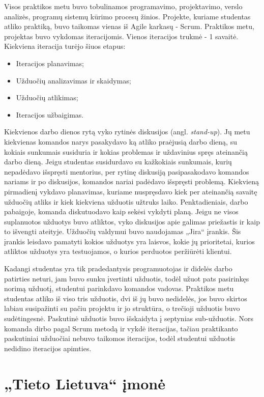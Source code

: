 \documentclass{VUMIFPSbakalaurinis}
\begin{document}
Visos praktikos metu buvo tobulinamos programavimo, projektavimo, verslo analizės, programų sistemų kūrimo procesų žinios. Projekte, kuriame studentas atliko praktiką, buvo taikomas vienas iš Agile karkasų - Scrum. Praktikos metu, projektas buvo vykdomas iteracijomis. Vienos iteracijos trukmė - 1 savaitė. Kiekviena iteracija turėjo šiuos etapus:
\begin{itemize}
    \item Iteracijos planavimas;
    \item Užduočių analizavimas ir skaidymas;
    \item Užduočių atlikimas;
    \item Iteracijos užbaigimas.
\end{itemize}
Kiekvienos darbo dienos rytą vyko rytinės diskusijos (angl. \textit{stand-up}). Jų metu kiekvienas komandos narys pasakydavo ką atliko praėjusią darbo dieną, su kokiais sunkumais susiduria ir kokias problemas ir uždavinius spręs ateinančią darbo dieną. Jeigu studentas susidurdavo su kažkokiais sunkumais, kurių nepadėdavo išspręsti mentorius, per rytinę diskusiją pasipasakodavo komandos nariams ir po diskusijos, komandos nariai padėdavo išspręsti problemą. Kiekvieną pirmadienį vykdavo planavimas, kuriame nuspręsdavo kiek per ateinančią savaitę užduočių atliks ir kiek kiekviena užduotis užtruks laiko. Penktadieniais, darbo pabaigoje, komanda diskutuodavo kaip sekėsi vykdyti planą. Jeigu ne visos suplanuotos užduotys buvo atliktos, vyko diskusijos apie galimas priežastis ir kaip to išvengti ateityje. Užduočių valdymui buvo naudojamas „Jira“ įrankis. Šis įrankis leisdavo pamatyti kokios užduotys yra laisvos, kokie jų prioritetai, kurios atliktos užduotys yra testuojamos, o kurios perduotos peržiūrėti klientui.


Kadangi studentas yra tik pradedantysis programuotojas ir didelės darbo patirties neturi, jam buvo sunku įvertinti užduotis, todėl užuot pats pasirinkęs norimą užduotį, studentui parinkdavo komandos vadovas. Praktikos metu studentas atliko iš viso tris užduotis, dvi iš jų buvo nedidelės, jos buvo skirtos labiau susipažinti su pačiu projektu ir jo struktūra, o trečioji užduotis buvo sudėtingesnė. Paskutinė užduotis buvo išskaidyta į septynias sub-užduotis. Nors komanda dirbo pagal Scrum metodą ir vykdė iteracijas, tačiau praktikanto paskutiniai užduočiai nebuvo taikomos iteracijos, todėl studentui užduotis nedidino iteracijos apimties.

\section{„Tieto Lietuva“ įmonė}
\end{document}
